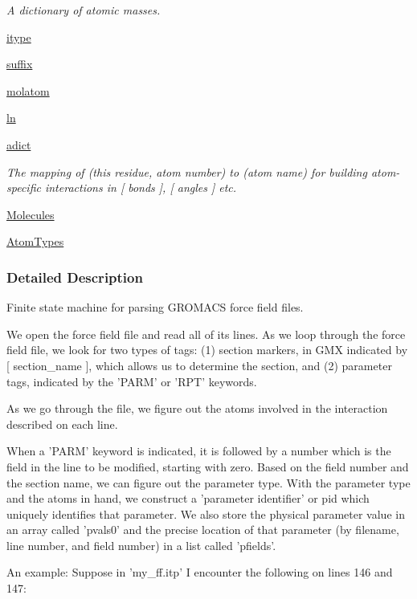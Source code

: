 \begin{DoxyCompactItemize}
\begin{DoxyCompactList}\small\item\em A dictionary of atomic masses. \end{DoxyCompactList}\item 
\hyperlink{classforcebalance_1_1gmxio_1_1ITP__Reader_a1809bf22503b8647f48ea37c9f6f4cee}{itype}
\item 
\hyperlink{classforcebalance_1_1gmxio_1_1ITP__Reader_a147438dd2683af88b92b659c96162848}{suffix}
\item 
\hyperlink{classforcebalance_1_1gmxio_1_1ITP__Reader_ad22477e12597eceeceedeb327d723094}{molatom}
\item 
\hyperlink{classforcebalance_1_1BaseReader_a80c8e3bea212600742968aa8669e557b}{ln}
\item 
\hyperlink{classforcebalance_1_1BaseReader_a2c46ad6b66cf09a30e917ce4a1997e2a}{adict}
\begin{DoxyCompactList}\small\item\em The mapping of (this residue, atom number) to (atom name) for building atom-\/specific interactions in \mbox{[} bonds \mbox{]}, \mbox{[} angles \mbox{]} etc. \end{DoxyCompactList}\item 
\hyperlink{classforcebalance_1_1BaseReader_a4369b5fb663a83b11602daa71db6862e}{Molecules}
\item 
\hyperlink{classforcebalance_1_1BaseReader_a69ca7d949a4a3df4d9f61e617fe0e270}{Atom\-Types}
\end{DoxyCompactItemize}


\subsubsection{Detailed Description}
Finite state machine for parsing G\-R\-O\-M\-A\-C\-S force field files. 

\begin{DoxyVerb} We open the force field file and read all of its lines.  As we loop
 through the force field file, we look for two types of tags: (1) section
 markers, in GMX indicated by [ section_name ], which allows us to determine
 the section, and (2) parameter tags, indicated by the 'PARM' or 'RPT' keywords.

 As we go through the file, we figure out the atoms involved in the interaction
 described on each line.

 When a 'PARM' keyword is indicated, it is followed by a number which is the field
 in the line to be modified, starting with zero.  Based on the field number and the
 section name, we can figure out the parameter type.  With the parameter type
 and the atoms in hand, we construct a 'parameter identifier' or pid which uniquely
 identifies that parameter.  We also store the physical parameter value in an array
 called 'pvals0' and the precise location of that parameter (by filename, line number,
 and field number) in a list called 'pfields'.

 An example: Suppose in 'my_ff.itp' I encounter the following on lines 146 and 147:
\end{DoxyVerb}



